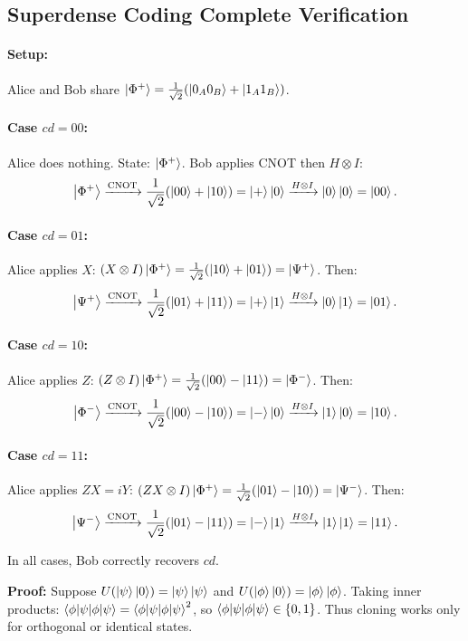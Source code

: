 \documentclass[10pt,a4paper]{article}
\begin{document}
\subsection{Superdense Coding Complete Verification}

\paragraph{Setup:} Alice and Bob share $\ket{\Phi^+}=\frac{1}{\sqrt{2}}(\ket{0_A0_B}+\ket{1_A1_B})$.

\paragraph{Case $cd=00$:} Alice does nothing. State: $\ket{\Phi^+}$. Bob applies CNOT then $H\otimes I$:
\[
\ket{\Phi^+}\xrightarrow{\text{CNOT}}\frac{1}{\sqrt{2}}(\ket{00}+\ket{10})=\ket{+}\ket{0}\xrightarrow{H\otimes I}\ket{0}\ket{0}=\ket{00}.
\]

\paragraph{Case $cd=01$:} Alice applies $X$: $(X\otimes I)\ket{\Phi^+}=\frac{1}{\sqrt{2}}(\ket{10}+\ket{01})=\ket{\Psi^+}$. Then:
\[
\ket{\Psi^+}\xrightarrow{\text{CNOT}}\frac{1}{\sqrt{2}}(\ket{01}+\ket{11})=\ket{+}\ket{1}\xrightarrow{H\otimes I}\ket{0}\ket{1}=\ket{01}.
\]

\paragraph{Case $cd=10$:} Alice applies $Z$: $(Z\otimes I)\ket{\Phi^+}=\frac{1}{\sqrt{2}}(\ket{00}-\ket{11})=\ket{\Phi^-}$. Then:
\[
\ket{\Phi^-}\xrightarrow{\text{CNOT}}\frac{1}{\sqrt{2}}(\ket{00}-\ket{10})=\ket{-}\ket{0}\xrightarrow{H\otimes I}\ket{1}\ket{0}=\ket{10}.
\]

\paragraph{Case $cd=11$:} Alice applies $ZX=iY$: $(ZX\otimes I)\ket{\Phi^+}=\frac{1}{\sqrt{2}}(\ket{01}-\ket{10})=\ket{\Psi^-}$. Then:
\[
\ket{\Psi^-}\xrightarrow{\text{CNOT}}\frac{1}{\sqrt{2}}(\ket{01}-\ket{11})=\ket{-}\ket{1}\xrightarrow{H\otimes I}\ket{1}\ket{1}=\ket{11}.
\]

In all cases, Bob correctly recovers $cd$.

\textbf{Proof:} Suppose $U(\ket{\psi}\ket{0})=\ket{\psi}\ket{\psi}$ and $U(\ket{\phi}\ket{0})=\ket{\phi}\ket{\phi}$. Taking inner products: $\braket{\phi|\psi}=\braket{\phi|\psi}^2$, so $\braket{\phi|\psi}\in\{0,1\}$. Thus cloning works only for orthogonal or identical states.
\end{document}
